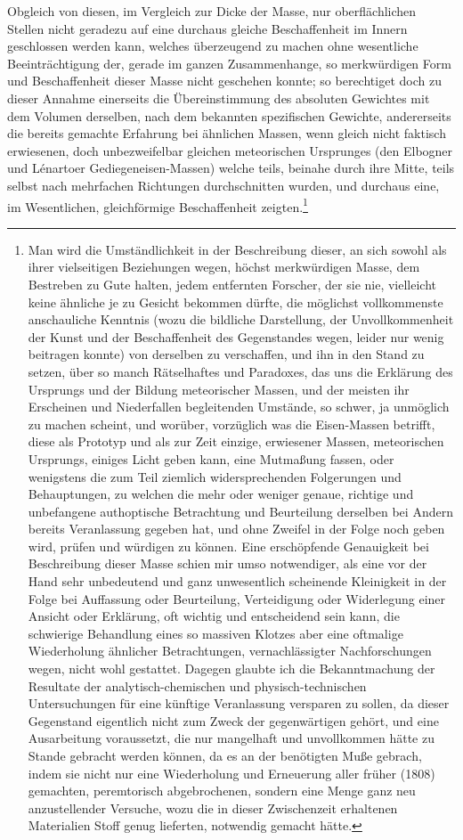 \documentclass[a4paper, 11pt, oneside, german]{article}
\begin{document}
Obgleich von diesen, im Vergleich zur Dicke der Masse, nur oberflächlichen Stellen nicht geradezu auf eine durchaus gleiche Beschaffenheit im Innern geschlossen werden kann, welches überzeugend zu machen ohne wesentliche Beeinträchtigung der, gerade im ganzen Zusammenhange, so merkwürdigen Form und Beschaffenheit dieser Masse nicht geschehen konnte; so berechtiget doch zu dieser Annahme einerseits die Übereinstimmung des absoluten Gewichtes mit dem Volumen derselben, nach dem bekannten spezifischen Gewichte, andererseits die bereits gemachte Erfahrung bei ähnlichen Massen, wenn gleich nicht faktisch erwiesenen, doch unbezweifelbar gleichen meteorischen Ursprunges (den Elbogner und Lénartoer Gediegeneisen-Massen) welche teils, beinahe durch ihre Mitte, teils selbst nach mehrfachen Richtungen durchschnitten wurden, und durchaus eine, im Wesentlichen, gleichförmige Beschaffenheit zeigten.\footnote{Man wird die Umständlichkeit in der Beschreibung dieser, an sich sowohl als ihrer vielseitigen Beziehungen wegen, höchst merkwürdigen Masse, dem Bestreben zu Gute halten, jedem entfernten Forscher, der sie nie, vielleicht keine ähnliche je zu Gesicht bekommen dürfte, die möglichst vollkommenste anschauliche Kenntnis (wozu die bildliche Darstellung, der Unvollkommenheit der Kunst und der Beschaffenheit des Gegenstandes wegen, leider nur wenig beitragen konnte) von derselben zu verschaffen, und ihn in den Stand zu setzen, über so manch Rätselhaftes und Paradoxes, das uns die Erklärung des Ursprungs und der Bildung meteorischer Massen, und der meisten ihr Erscheinen und Niederfallen begleitenden Umstände, so schwer, ja unmöglich zu machen scheint, und worüber, vorzüglich was die Eisen-Massen betrifft, diese als Prototyp und als zur Zeit einzige, erwiesener Massen, meteorischen Ursprungs, einiges Licht geben kann, eine Mutmaßung fassen, oder wenigstens die zum Teil ziemlich widersprechenden Folgerungen und Behauptungen, zu welchen die mehr oder weniger genaue, richtige und unbefangene authoptische Betrachtung und Beurteilung derselben bei Andern bereits Veranlassung gegeben hat, und ohne Zweifel in der Folge noch geben wird, prüfen und würdigen zu können. Eine erschöpfende Genauigkeit bei Beschreibung dieser Masse schien mir umso notwendiger, als eine vor der Hand sehr unbedeutend und ganz unwesentlich scheinende Kleinigkeit in der Folge bei Auffassung oder Beurteilung, Verteidigung oder Widerlegung einer Ansicht oder Erklärung, oft wichtig und entscheidend sein kann, die schwierige Behandlung eines so massiven Klotzes aber eine oftmalige Wiederholung ähnlicher Betrachtungen, vernachlässigter Nachforschungen wegen, nicht wohl gestattet. Dagegen glaubte ich die Bekanntmachung der Resultate der analytisch-chemischen und physisch-technischen Untersuchungen für eine künftige Veranlassung versparen zu sollen, da dieser Gegenstand eigentlich nicht zum Zweck der gegenwärtigen gehört, und eine Ausarbeitung voraussetzt, die nur mangelhaft und unvollkommen hätte zu Stande gebracht werden können, da es an der benötigten Muße gebrach, indem sie nicht nur eine Wiederholung und Erneuerung aller früher (1808) gemachten, peremtorisch abgebrochenen, sondern eine Menge ganz neu anzustellender Versuche, wozu die in dieser Zwischenzeit erhaltenen Materialien Stoff genug lieferten, notwendig gemacht hätte.}
\end{document}
